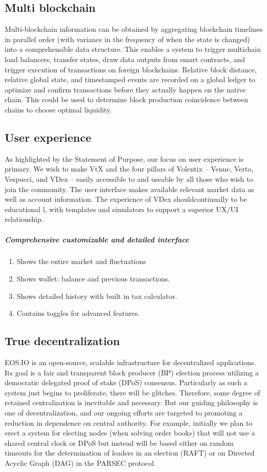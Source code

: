\documentclass[]{article}
\begin{document}
{	
	\subsection{Multi blockchain}
	Multi-blockchain information can be obtained by aggregating blockchain timelines in parallel order 
	(with variance in the frequency of when the state is changed) into a comprehensible data structure.
	This enables a system to trigger multichain load balancers, transfer states, draw data outputs from smart contracts, 
	and trigger execution of transactions on foreign blockchains. 
	Relative block distance, relative global state, and timestamped events are recorded on a global ledger to optimize and confirm transactions 
	before they actually happen on the native chain.
	This could be used to determine block production coincidence between chains to choose optimal liquidity.\cite{20}
	
	\subsection{User experience}
	As highlighted by the Statement of Purpose, our focus on user experience is primary. We wish to make VtX and the four pillars of Volentix -- Venue, Verto, Vespucci, and VDex -- easily accessible to and useable by all those who wish to join the community. The user interface makes available relevant market data as well as  account information. The experience of VDex shouldcontinually to be educational l, with templates and simulators to support a superior UX/UI relationship. 
	\subparagraph{Comprehensive customizable and detailed interface}
	\begin{enumerate}
		\item Shows the entire market and fluctuations
		\item Shows wallet: balance and previous transactions.
		\item Shows detailed history with built in tax calculator.
		\item Contains toggles for advanced features.		 
	\end{enumerate}
	
	\subsection{True decentralization}
	 
	EOS.IO is an open-source, scalable infrastructure for decentralized applications. Its goal is a fair and transparent block producer (BP) election process utilizing a democratic delegated proof of stake (DPoS) consensus. Particularly as such a system just begins to proliferate, there will be glitches.  Therefore, some degree of retained centralization is inevitable and necessary. But our guiding philosophy is one of decentralization, and our ongoing efforts are targeted to promoting a reduction in dependence on central authority. 
	For example, initially we plan to erect a system for electing nodes (when solving order books) that will not use a shared central clock or DPoS but instead will be based either on random timeouts for the determination of leaders in an election (RAFT) or on Directed Acyclic Graph (DAG) in the PARSEC protocol.
	
}
\end{document}
